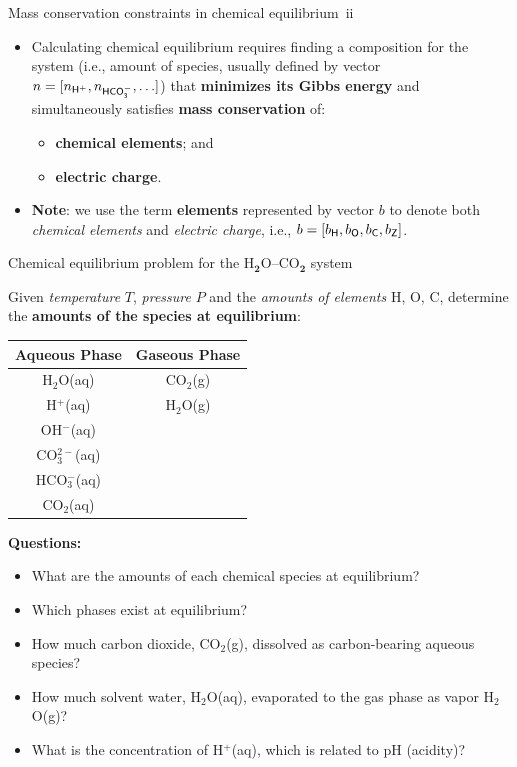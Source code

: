 %
\begin{frame}{Mass conservation constraints in chemical equilibrium\, ii}
\begin{itemize}
		\item Calculating chemical equilibrium requires finding a composition for
		the system (i.e., amount of species, usually defined by vector 
		$n = [n_{\sf H^{+}}, n_{\sf HCO_{3}^{-}}, \ldots]$) that 
		\textbf{minimizes its Gibbs energy} and simultaneously satisfies 
		\alert{\textbf{mass conservation}} of:
		\begin{itemize}
			\item \textbf{chemical elements}; and
			\item \textbf{electric charge}.
		\end{itemize}
		\pause
		\item \alert{\textbf{Note}}: we use the term \alert{\textbf{elements}} represented by vector $b$ 
		to denote both \emph{chemical elements} and \emph{electric charge}, i.e., 
		$b = [b_{\sf H}, b_{\sf O}, b_{\sf C}, b_{\sf Z}]$.
	\end{itemize}
\end{frame}
%
%
\begin{frame}{Chemical equilibrium problem for the H$_{\boldsymbol{2}}$O–CO$_{\boldsymbol{2}}$
system}

\lcol

Given \emph{temperature} $T$, \emph{pressure} $P$ and the \emph{amounts
of elements} H, O, C, determine \\
the \textbf{amounts of the species at equilibrium}:
\begin{center}
\begin{tabular}{cc}
\toprule 
\multicolumn{1}{c}{\textbf{Aqueous Phase}} & \multicolumn{1}{c}{\textbf{Gaseous Phase}}\tabularnewline
\midrule
H$_{2}$O(aq) & CO$_{2}$(g)\tabularnewline
H$^{+}$(aq) & H$_{2}$O(g)\tabularnewline
OH$^{-}$(aq) & \tabularnewline
CO$_{3}^{2-}$(aq) & \tabularnewline
HCO$_{3}^{-}$(aq) & \tabularnewline
CO$_{2}$(aq) & \tabularnewline
\bottomrule
\end{tabular} 
\par\end{center}

\rcol
\pause
\vskip 5pt
\alert{\textbf{Questions:}}
\begin{itemize}
\item What are the amounts of each chemical species at equilibrium? 
\item Which phases exist at equilibrium? 
\item How much carbon dioxide, CO$_{2}$(g), dissolved as carbon-bearing
aqueous species? 
\item How much solvent water, H$_{2}$O(aq), evaporated to the gas phase
as vapor H$_{2}$O(g)? 
\item What is the concentration of H$^{+}$(aq), which is related to pH
(acidity)?
\end{itemize}
\ecol
\end{frame}
